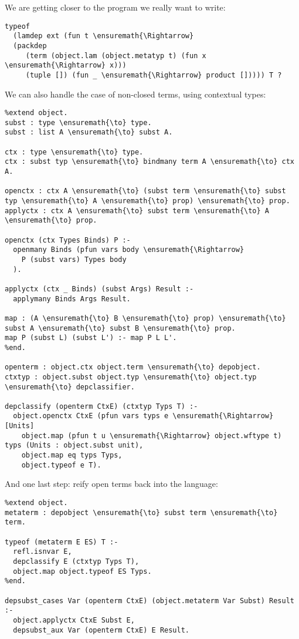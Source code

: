 We are getting closer to the program we really want to write:

\begin{verbatim}
typeof
  (lamdep ext (fun t \ensuremath{\Rightarrow}
  (packdep
     (term (object.lam (object.metatyp t) (fun x \ensuremath{\Rightarrow} x)))
     (tuple []) (fun _ \ensuremath{\Rightarrow} product [])))) T ?
\end{verbatim}

We can also handle the case of non-closed terms, using contextual types:

\begin{verbatim}
%extend object.
subst : type \ensuremath{\to} type.
subst : list A \ensuremath{\to} subst A.

ctx : type \ensuremath{\to} type.
ctx : subst typ \ensuremath{\to} bindmany term A \ensuremath{\to} ctx A.

openctx : ctx A \ensuremath{\to} (subst term \ensuremath{\to} subst typ \ensuremath{\to} A \ensuremath{\to} prop) \ensuremath{\to} prop.
applyctx : ctx A \ensuremath{\to} subst term \ensuremath{\to} A \ensuremath{\to} prop.

openctx (ctx Types Binds) P :-
  openmany Binds (pfun vars body \ensuremath{\Rightarrow}
    P (subst vars) Types body
  ).

applyctx (ctx _ Binds) (subst Args) Result :-
  applymany Binds Args Result.

map : (A \ensuremath{\to} B \ensuremath{\to} prop) \ensuremath{\to} subst A \ensuremath{\to} subst B \ensuremath{\to} prop.
map P (subst L) (subst L') :- map P L L'.
%end.

openterm : object.ctx object.term \ensuremath{\to} depobject.
ctxtyp : object.subst object.typ \ensuremath{\to} object.typ \ensuremath{\to} depclassifier.

depclassify (openterm CtxE) (ctxtyp Typs T) :-
  object.openctx CtxE (pfun vars typs e \ensuremath{\Rightarrow} [Units]
    object.map (pfun t u \ensuremath{\Rightarrow} object.wftype t) typs (Units : object.subst unit),
    object.map eq typs Typs,
    object.typeof e T).
\end{verbatim}

And one last step: reify open terms back into the language:

\begin{verbatim}
%extend object.
metaterm : depobject \ensuremath{\to} subst term \ensuremath{\to} term.

typeof (metaterm E ES) T :-
  refl.isnvar E,
  depclassify E (ctxtyp Typs T),
  object.map object.typeof ES Typs.
%end.

depsubst_cases Var (openterm CtxE) (object.metaterm Var Subst) Result :-
  object.applyctx CtxE Subst E,
  depsubst_aux Var (openterm CtxE) E Result.
\end{verbatim}
